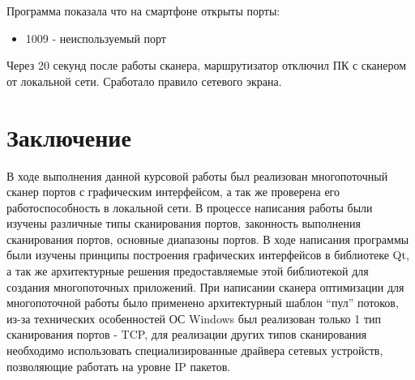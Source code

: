 Программа показала что на смартфоне открыты порты:

\begin{itemize}
\tightlist
\item
  1009 - неиспользуемый порт
\end{itemize}

Через 20 секунд после работы сканера, маршрутизатор отключил ПК с
сканером от локальной сети. Сработало правило сетевого экрана.

\hypertarget{ux437ux430ux43aux43bux44eux447ux435ux43dux438ux435}{%
\section{Заключение}\label{ux437ux430ux43aux43bux44eux447ux435ux43dux438ux435}}

В ходе выполнения данной курсовой работы был реализован многопоточный
сканер портов с графическим интерфейсом, а так же проверена его
работоспособность в локальной сети. В процессе написания работы были
изучены различные типы сканирования портов, законность выполнения
сканирования портов, основные диапазоны портов. В ходе написания
программы были изучены принципы построения графических интерфейсов в
библиотеке Qt, а так же архитектурные решения предоставляемые этой
библиотекой для создания многопоточных приложений. При написании сканера
оптимизации для многопоточной работы было применено архитектурный шаблон
``пул'' потоков, из-за технических особенностей ОС Windows был
реализован только 1 тип сканирования портов - TCP, для реализации других
типов сканирования необходимо использовать специализированные драйвера
сетевых устройств, позволяющие работать на уровне IP пакетов.
